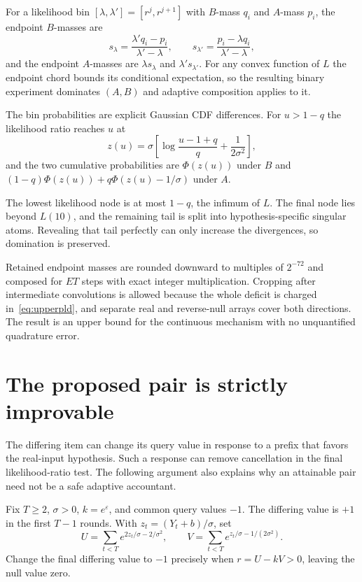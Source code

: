 \documentclass[conference]{IEEEtran}
\newcommand{\eps}{\varepsilon}
\begin{document}
For a likelihood bin $[\lambda,\lambda']=[r^j,r^{j+1}]$ with $B$-mass $q_i$ and $A$-mass $p_i$, the endpoint $B$-masses are
\[
 s_\lambda=\frac{\lambda'q_i-p_i}{\lambda'-\lambda},\qquad
 s_{\lambda'}=\frac{p_i-\lambda q_i}{\lambda'-\lambda},
\]
and the endpoint $A$-masses are $\lambda s_\lambda$ and $\lambda's_{\lambda'}$. For any convex function of $L$ the endpoint chord bounds its conditional expectation, so the resulting binary experiment dominates $(A,B)$ and adaptive composition applies to it.

The bin probabilities are explicit Gaussian CDF differences. For $u>1-q$ the likelihood ratio reaches $u$ at
\[
 z(u)=\sigma\left[\log\frac{u-1+q}{q}+\frac1{2\sigma^2}\right],
\]
and the two cumulative probabilities are $\Phi(z(u))$ under $B$ and $(1-q)\Phi(z(u))+q\Phi(z(u)-1/\sigma)$ under $A$.

The lowest likelihood node is at most $1-q$, the infimum of $L$. The final node lies beyond $L(10)$, and the remaining tail is split into hypothesis-specific singular atoms. Revealing that tail perfectly can only increase the divergences, so domination is preserved.

Retained endpoint masses are rounded downward to multiples of $2^{-72}$ and composed for $ET$ steps with exact integer multiplication. Cropping after intermediate convolutions is allowed because the whole deficit is charged in~\eqref{eq:upperpld}, and separate real and reverse-null arrays cover both directions. The result is an upper bound for the continuous mechanism with no unquantified quadrature error.

\section{The proposed pair is strictly improvable}\label{app:reflection}
The differing item can change its query value in response to a prefix that favors the real-input hypothesis. Such a response can remove cancellation in the final likelihood-ratio test. The following argument also explains why an attainable pair need not be a safe adaptive accountant.

Fix $T\ge2$, $\sigma>0$, $k=e^\eps$, and common query values $-1$. The differing value is $+1$ in the first $T-1$ rounds. With $z_t=(Y_t+b)/\sigma$, set
\[
 U=\sum_{t<T}e^{2z_t/\sigma-2/\sigma^2},\qquad
 V=\sum_{t<T}e^{z_t/\sigma-1/(2\sigma^2)}.
\]
Change the final differing value to $-1$ precisely when $r=U-kV>0$, leaving the null value zero.
\end{document}
